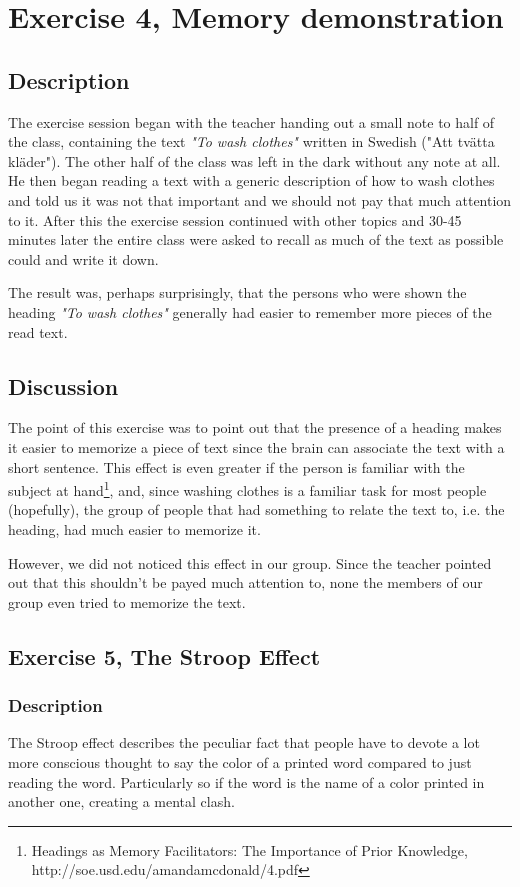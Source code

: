 \documentclass[10pt, a4paper]{article}
\begin{document}
\section{Exercise 4, Memory demonstration}
\subsection{Description}
The exercise session began with the teacher handing out a small note to half of the class, containing the text \emph{"To wash clothes"} written in Swedish ("Att tvätta kläder"). The other half of the class was left in the dark without any note at all. He then began reading a text with a generic description of how to wash clothes and told us it was not that important and we should not pay that much attention to it. After this the exercise session continued with other topics and 30-45 minutes later the entire class were asked to recall as much of the text as possible could and write it down.

The result was, perhaps surprisingly, that the persons who were shown the heading \emph{"To wash clothes"} generally had easier to remember more pieces of the read text.

\subsection{Discussion}
The point of this exercise was to point out that the presence of a heading makes it easier to memorize a piece of text since the brain can associate the text with a short sentence. This effect is even greater if the person is familiar with the subject at hand\footnote{Headings as Memory Facilitators: The Importance of Prior Knowledge, http://soe.usd.edu/amandamcdonald/4.pdf}, and, since washing clothes is a familiar task for most people (hopefully), the group of people that had something to relate the text to, i.e. the heading, had much easier to memorize it.

However, we did not noticed this effect in our group. Since the teacher pointed out that this shouldn't be payed much attention to, none the members of our group even tried to memorize the text.

\subsection{Exercise 5, The Stroop Effect}
\subsubsection{Description}
The Stroop effect describes the peculiar fact that people have to devote a lot more conscious thought to say the color of a printed word compared to just reading the word. Particularly so if the word is the name of a color printed in another one, creating a mental clash.
\end{document}

